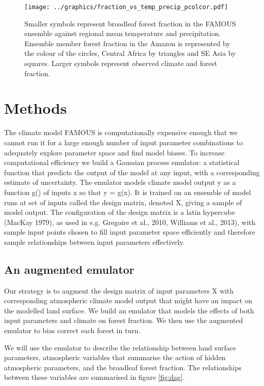 \documentclass[gmd, manuscript]{copernicus}
\begin{document}
\begin{figure}[t]
\texttt{[image: ../graphics/fraction\_vs\_temp\_precip\_pcolcor.pdf]}
\caption{Smaller symbols represent broadleaf forest fraction in the FAMOUS ensemble against regional mean temperature and precipitation. Ensemble member forest fraction in the Amazon is represented by the colour of the circles, Central Africa by triangles and SE Asia by squares. Larger symbols represent observed climate and forest fraction.
}
\label{fig:fraction_vs_temp_precip_pcolcor}
\end{figure}


\section{Methods}
The climate model FAMOUS is computationally expensive enough that we cannot run it for a large enough number of input parameter combinations to adequately explore parameter space and find model biases. To increase computational efficiency we build a Gaussian process emulator: a statistical function that predicts the output of the model at any input, with a corresponding estimate of uncertainty. The emulator models climate model output y as a function g() of inputs x so that y = g(x). It is trained on an ensemble of model runs at set of inputs called the design matrix, denoted X, giving a sample of model output. The configuration of the design matrix is a latin hypercube (MacKay 1979), as used in  e.g. Gregoire et al., 2010, Williams et al., 2013), with sample input points chosen to fill input parameter space efficiently and therefore sample relationships between input parameters effectively.

\subsection{An augmented emulator}
Our strategy is to augment the design matrix of input parameters X with corresponding atmospheric climate model output that might have an impact on the modelled land surface. We build an emulator that models the effects of both input parameters and climate on forest fraction. We then use the augmented emulator to bias correct each forest in turn.

We will use the emulator to describe the relationship between land surface parameters, atmospheric variables that summarise the action of hidden atmospheric parameters, and the broadleaf forest fraction. The relationships between these variables are summarised in figure \ref{fig:dag}. 
\end{document}
